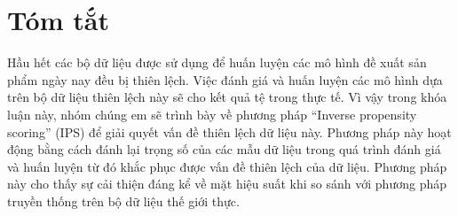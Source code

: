 \chapter*{Tóm tắt}
\label{summary}
Hầu hết các bộ dữ liệu được sử dụng để huấn luyện các mô hình đề xuất sản phẩm ngày nay đều bị thiên lệch. Việc đánh giá và huấn luyện các mô hình dựa trên bộ dữ liệu thiên lệch này sẽ cho kết quả tệ trong thực tế. Vì vậy trong khóa luận này, nhóm chúng em sẽ trình bày về phương pháp “Inverse propensity scoring” (IPS) để giải quyết vấn đề thiên lệch dữ liệu này. Phương pháp này hoạt động bằng cách đánh lại trọng số của các mẫu dữ liệu trong quá trình đánh giá và huấn luyện từ đó khắc phục được vấn đề thiên lệch của dữ liệu. Phương pháp này cho thấy sự cải thiện đáng kể về mặt hiệu suất khi so sánh với phương pháp truyền thống trên bộ dữ liệu thế giới thực. 